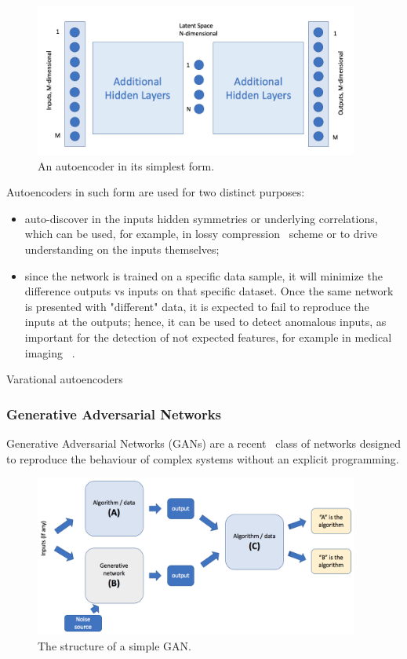 \begin{figure}[h]
     \centering
     \includegraphics[width=0.95\textwidth]{images/autoencoder.png}
     \caption{An autoencoder in its simplest form.}
     \label{fig:autoencoder}
 \end{figure}
 
 Autoencoders in such form are used for two distinct purposes:
 \begin{itemize}
     \item auto-discover in the inputs hidden symmetries or underlying correlations, which can be used, for example, in lossy compression~\cite{compression} scheme or to drive understanding on the inputs themselves; %
     \item since the network is trained on a specific data sample, it will minimize the difference outputs vs inputs on that specific dataset. Once the same network is presented with "different" data, it is expected to fail to reproduce the inputs at the outputs; hence, it can be used to detect anomalous inputs, as important for the detection of not expected features, for example in medical imaging ~\cite{anomalymed}. %
 \end{itemize}
 
 Varational autoencoders 

\subsubsection{Generative Adversarial Networks}
Generative Adversarial Networks (GANs) are a recent~\cite{goodfellow} class of networks designed to reproduce the behaviour of complex systems without an explicit programming.

\begin{figure}[h]
     \centering
     \includegraphics[width=0.95\textwidth]{images/gan.png}
     \caption{The structure of a simple GAN.}
     \label{fig:gan}
 \end{figure}

